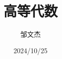 \documentclass[lang=cn,newtx,10pt,scheme=chinese]{../Template/elegantbook}
\title{高等代数}
\author{邹文杰}
\institute{无}
\date{2024/10/25}
\begin{document}

\maketitle
\frontmatter

\tableofcontents%

\mainmatter
\everymath{\displaystyle} %






% 

% 

% 

% 

% 

% 

% 

% 

% 

% 

% 



\end{document}

